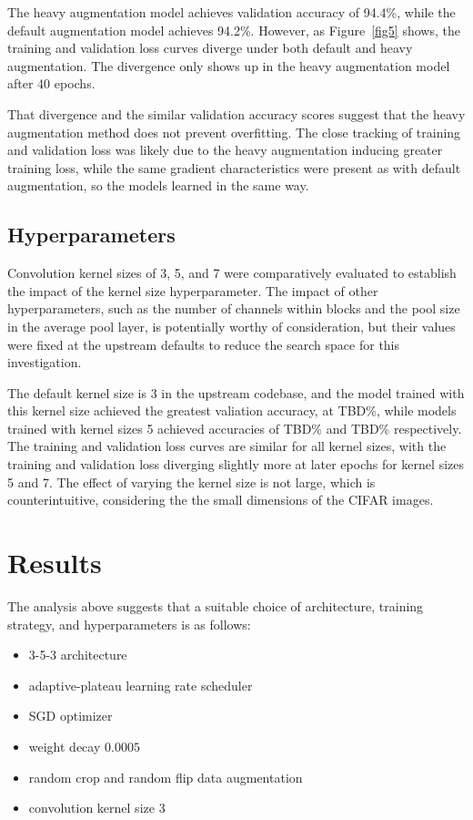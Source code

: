 \documentclass[letterpaper]{article} %
\begin{document}
The heavy augmentation model achieves validation accuracy of 94.4\%, while the default
augmentation model achieves 94.2\%.
However, as Figure~\ref{fig5} shows, the training and validation loss curves diverge under
both default and heavy augmentation.
The divergence only shows up in the heavy augmentation model after 40 epochs.

That divergence and the similar validation accuracy scores suggest that the heavy augmentation
method does not prevent overfitting.
The close tracking of training and validation loss was likely due to the heavy
augmentation inducing greater training loss,
while the same gradient characteristics were present as with default augmentation, so the models learned
in the same way.

\subsection{Hyperparameters}

Convolution kernel sizes of 3, 5, and 7 were comparatively evaluated to establish the impact of the
kernel size hyperparameter.
The impact of other hyperparameters, such as the number of channels within blocks and the pool size in the average pool
layer, is potentially worthy of consideration, but their values were fixed at the upstream defaults to reduce the
search space for this investigation.

The default kernel size is 3 in the upstream codebase, and the model trained with this kernel size achieved the
greatest valiation accuracy, at TBD\%, while models trained with kernel sizes 5 achieved accuracies
of TBD\% and TBD\% respectively.
The training and validation loss curves are similar for all kernel sizes, with the training and validation
loss diverging slightly more at later epochs for kernel sizes 5 and 7.
The effect of varying the kernel size is not large, which is counterintuitive, considering the
the small dimensions of the CIFAR images.

\section{Results}

The analysis above suggests that a suitable choice of architecture, training strategy, and hyperparameters
is as follows:
\begin{itemize}
    \item 3-5-3 architecture
    \item adaptive-plateau learning rate scheduler
    \item SGD optimizer
    \item weight decay $ 0.0005 $
    \item random crop and random flip data augmentation
    \item convolution kernel size $ 3 $
\end{itemize}
\end{document}
